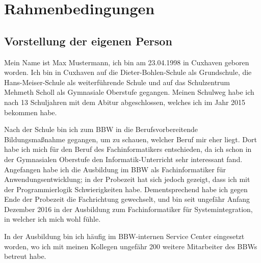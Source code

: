 \section{Rahmenbedingungen}
\label{sec:Rahmenbedingungen}


\subsection{Vorstellung der eigenen Person} 
\label{sec:eigene Person}
Mein Name ist Max Mustermann, ich bin am 23.04.1998 in Cuxhaven geboren worden. Ich bin in Cuxhaven auf die Dieter-Bohlen-Schule als Grundschule, die Hans-Meiser-Schule als weiterführende Schule und auf das Schulzentrum Mehmeth Scholl als Gymnasiale Oberstufe gegangen. Meinen Schulweg habe ich nach 13 Schuljahren mit dem Abitur abgeschlossen, welches ich im Jahr 2015 bekommen habe. 

Nach der Schule bin ich zum \ac{BBW} in die Berufsvorbereitende Bildungsmaßnahme gegangen, um zu schauen, welcher Beruf mir eher liegt. Dort habe ich mich für den Beruf des Fachinformatikers entschieden, da ich schon in der Gymnasialen Oberstufe den Informatik-Unterricht sehr interessant fand. Angefangen habe ich die Ausbildung im \ac{BBW} als Fachinformatiker für Anwendungsentwicklung; in der Probezeit hat sich jedoch gezeigt, dass ich mit der Programmierlogik Schwierigkeiten habe. Dementsprechend habe ich gegen Ende der Probezeit die Fachrichtung gewechselt, und bin seit ungefähr Anfang Dezember 2016 in der Ausbildung zum Fachinformatiker für Systemintegration, in welcher ich mich wohl fühle. 

In der Ausbildung bin ich häufig im \ac{BBW}-internen Service Center eingesetzt worden, wo ich mit meinen Kollegen ungefähr 200 weitere Mitarbeiter des \ac{BBW}s betreut habe.
